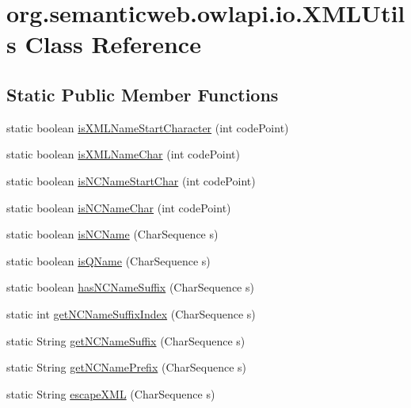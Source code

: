 \hypertarget{classorg_1_1semanticweb_1_1owlapi_1_1io_1_1_x_m_l_utils}{\section{org.\-semanticweb.\-owlapi.\-io.\-X\-M\-L\-Utils Class Reference}
\label{classorg_1_1semanticweb_1_1owlapi_1_1io_1_1_x_m_l_utils}
}
\subsection*{Static Public Member Functions}
\begin{DoxyCompactItemize}
\item 
static boolean \hyperlink{classorg_1_1semanticweb_1_1owlapi_1_1io_1_1_x_m_l_utils_a3f767c23482a64ca611660c6179f6c7a}{is\-X\-M\-L\-Name\-Start\-Character} (int code\-Point)
\item 
static boolean \hyperlink{classorg_1_1semanticweb_1_1owlapi_1_1io_1_1_x_m_l_utils_ad73ce39ff63e507c2e9ec8b219672d7a}{is\-X\-M\-L\-Name\-Char} (int code\-Point)
\item 
static boolean \hyperlink{classorg_1_1semanticweb_1_1owlapi_1_1io_1_1_x_m_l_utils_af82788244a122900560f8d725456d43a}{is\-N\-C\-Name\-Start\-Char} (int code\-Point)
\item 
static boolean \hyperlink{classorg_1_1semanticweb_1_1owlapi_1_1io_1_1_x_m_l_utils_a6b28b328a15330281c0c8b2246de5564}{is\-N\-C\-Name\-Char} (int code\-Point)
\item 
static boolean \hyperlink{classorg_1_1semanticweb_1_1owlapi_1_1io_1_1_x_m_l_utils_a995f5b4f95ff6cdf6f4cea83d4c550ac}{is\-N\-C\-Name} (Char\-Sequence s)
\item 
static boolean \hyperlink{classorg_1_1semanticweb_1_1owlapi_1_1io_1_1_x_m_l_utils_a25e9e0f1f663b0469b444b99c2fc4e0c}{is\-Q\-Name} (Char\-Sequence s)
\item 
static boolean \hyperlink{classorg_1_1semanticweb_1_1owlapi_1_1io_1_1_x_m_l_utils_a2dd2fc93ffd70d7b8e9e265df67df3bf}{has\-N\-C\-Name\-Suffix} (Char\-Sequence s)
\item 
static int \hyperlink{classorg_1_1semanticweb_1_1owlapi_1_1io_1_1_x_m_l_utils_a60b5a3fd7c08cf6740b531a9e4bec0df}{get\-N\-C\-Name\-Suffix\-Index} (Char\-Sequence s)
\item 
static String \hyperlink{classorg_1_1semanticweb_1_1owlapi_1_1io_1_1_x_m_l_utils_a9fc590cb73a041606a4543e3493377a4}{get\-N\-C\-Name\-Suffix} (Char\-Sequence s)
\item 
static String \hyperlink{classorg_1_1semanticweb_1_1owlapi_1_1io_1_1_x_m_l_utils_a977782088cd022dae37a97174f98d623}{get\-N\-C\-Name\-Prefix} (Char\-Sequence s)
\item 
static String \hyperlink{classorg_1_1semanticweb_1_1owlapi_1_1io_1_1_x_m_l_utils_a1a205c2f88c8b381b5881f724c330ff2}{escape\-X\-M\-L} (Char\-Sequence s)
\end{DoxyCompactItemize}
